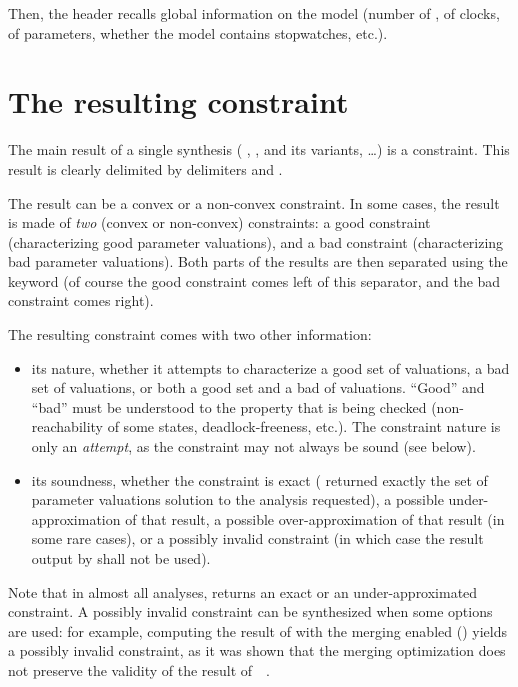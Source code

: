 Then, the header recalls global information on the model (number of \IPTA{}, of clocks, of parameters, whether the model contains stopwatches, etc.).


\section{The resulting constraint}

The main result of a single synthesis (\ie{} \EFsynth{}, \PDFC{}, \IM{} and its variants, \PRP{}…) is a constraint.
This result is clearly delimited by delimiters  and .

The result can be a convex or a non-convex constraint.
In some cases, the result is made of \emph{two} (convex or non-convex) constraints: a good constraint (characterizing good parameter valuations), and a bad constraint (characterizing bad parameter valuations).
Both parts of the results are then separated using the keyword  (of course the good constraint comes left of this separator, and the bad constraint comes right).

The resulting constraint comes with two other information:
\begin{itemize}
	\item its nature, \ie{} whether it attempts to characterize a good set of valuations, a bad set of valuations, or both a good set and a bad of valuations.
	      ``Good'' and ``bad'' must be understood to the property that is being checked (non-reachability of some states, deadlock-freeness, etc.).
	      The constraint nature is only an \emph{attempt}, as the constraint may not always be sound (see below).
	\item its soundness, \ie{} whether the constraint is exact (\imitator{} returned exactly the set of parameter valuations solution to the analysis requested), a possible under-approximation of that result, a possible over-approximation of that result (in some rare cases), or a possibly invalid constraint (in which case the result output by \imitator{} shall not be used).
\end{itemize}
Note that in almost all analyses, \imitator{} returns an exact or an under-approximated constraint.
A possibly invalid constraint can be synthesized when some options are used: for example, computing the result of \IM{} with the merging enabled () yields a possibly invalid constraint, as it was shown that the merging optimization does not preserve the validity of the result of~\IM{}~\cite{AFS13atva}.

